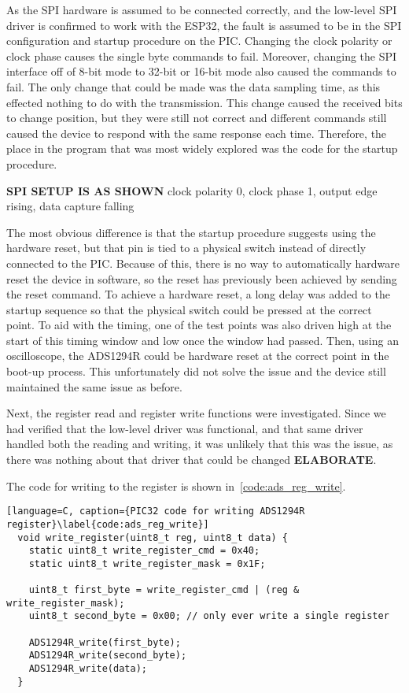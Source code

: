 As the SPI hardware is assumed to be connected correctly, and the low-level SPI driver is confirmed to work with the ESP32,
the fault is assumed to be in the SPI configuration and startup procedure on the PIC.
Changing the clock polarity or clock phase causes the single byte commands to fail.
Moreover, changing the SPI interface off of 8-bit mode to 32-bit or 16-bit mode also caused the commands to fail.
The only change that could be made was the data sampling time, as this effected nothing to do with the transmission.
This change caused the received bits to change position,
but they were still not correct and different commands still caused the device to respond with the same response each time.
Therefore, the place in the program that was most widely explored was the code for the startup procedure.

\textbf{SPI SETUP IS AS SHOWN}
clock polarity 0, clock phase 1, output edge rising, data capture falling

The most obvious difference is that the startup procedure suggests using the hardware reset,
but that pin is tied to a physical switch instead of directly connected to the PIC.
Because of this, there is no way to automatically hardware reset the device in software,
so the reset has previously been achieved by sending the reset command.
To achieve a hardware reset, a long delay was added to the startup sequence so that the physical switch could be pressed at the correct point.
To aid with the timing, one of the test points was also driven high at the start of this timing window and low once the window had passed.
Then, using an oscilloscope, the ADS1294R could be hardware reset at the correct point in the boot-up process.
This unfortunately did not solve the issue and the device still maintained the same issue as before.

Next, the register read and register write functions were investigated.
Since we had verified that the low-level driver was functional, and that same driver handled both the reading and writing,
it was unlikely that this was the issue, as there was nothing about that driver that could be changed \textbf{ELABORATE}.

The code for writing to the register is shown in~\autoref{code:ads_reg_write}.

\begin{lstlisting}[language=C, caption={PIC32 code for writing ADS1294R register}\label{code:ads_reg_write}]
  void write_register(uint8_t reg, uint8_t data) {
    static uint8_t write_register_cmd = 0x40;
    static uint8_t write_register_mask = 0x1F;

    uint8_t first_byte = write_register_cmd | (reg & write_register_mask);
    uint8_t second_byte = 0x00; // only ever write a single register

    ADS1294R_write(first_byte);
    ADS1294R_write(second_byte);
    ADS1294R_write(data);
  }
\end{lstlisting}

